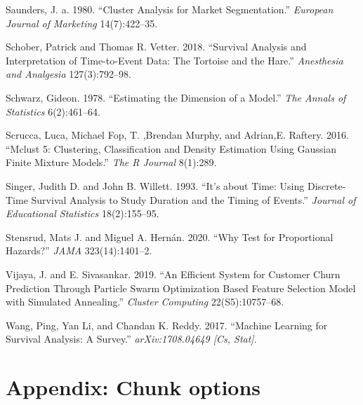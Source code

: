 \documentclass[
  12pt,
]{article}
\newlength{\cslhangindent}
\newlength{\cslentryspacingunit} %
\newenvironment{CSLReferences}[2] %
 {%
  \setlength{\parindent}{0pt}
  \ifodd #1
  \let\oldpar\par
  \def\par{\hangindent=\cslhangindent\oldpar}
  \fi
  \setlength{\parskip}{#2\cslentryspacingunit}
 }%
 {}
\begin{document}
\begin{CSLReferences}{1}{0}
\leavevmode{}%
Saunders, J. a. 1980. {``Cluster Analysis for Market Segmentation.''} \emph{European Journal of Marketing} 14(7):422--35.

\leavevmode{}%
Schober, Patrick and Thomas R. Vetter. 2018. {``Survival Analysis and Interpretation of Time-to-Event Data: The Tortoise and the Hare.''} \emph{Anesthesia and Analgesia} 127(3):792--98.

\leavevmode{}%
Schwarz, Gideon. 1978. {``Estimating the Dimension of a Model.''} \emph{The Annals of Statistics} 6(2):461--64.

\leavevmode{}%
Scrucca, Luca, Michael Fop, T. ,Brendan Murphy, and Adrian,E. Raftery. 2016. {``Mclust 5: Clustering, Classification and Density Estimation Using Gaussian Finite Mixture Models.''} \emph{The R Journal} 8(1):289.

\leavevmode{}%
Singer, Judith D. and John B. Willett. 1993. {``It's about Time: Using Discrete-Time Survival Analysis to Study Duration and the Timing of Events.''} \emph{Journal of Educational Statistics} 18(2):155--95.

\leavevmode{}%
Stensrud, Mats J. and Miguel A. Hernán. 2020. {``Why Test for Proportional Hazards?''} \emph{JAMA} 323(14):1401--2.

\leavevmode{}%
Vijaya, J. and E. Sivasankar. 2019. {``An Efficient System for Customer Churn Prediction Through Particle Swarm Optimization Based Feature Selection Model with Simulated Annealing.''} \emph{Cluster Computing} 22(S5):10757--68.

\leavevmode{}%
Wang, Ping, Yan Li, and Chandan K. Reddy. 2017. {``Machine Learning for Survival Analysis: A Survey.''} \emph{arXiv:1708.04649 {[}Cs, Stat{]}}.

\end{CSLReferences}

\hypertarget{appendix-chunk-options}{%
\section*{Appendix: Chunk options}\label{appendix-chunk-options}}
\end{document}

